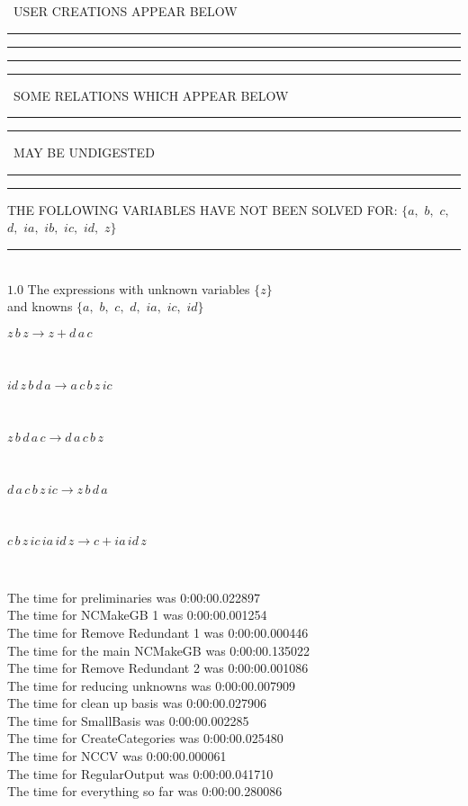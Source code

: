 \documentclass[rep10,leqno]{report}
\begin{document}
\ USER CREATIONS APPEAR BELOW\ 
\rule[2.5pt]{1.701in}{1pt}\hfil\break
\rule[2pt]{6in}{1pt}\hfil\break
\rule[2pt]{6in}{4pt}\hfil\break
\rule[2pt]{1.45in}{4pt}
\ SOME RELATIONS WHICH APPEAR BELOW\ 
\rule[2pt]{1.45in}{4pt}\hfil\break
\rule[2pt]{2.18in}{4pt}
\ MAY BE UNDIGESTED\ 
\rule[2pt]{2.18in}{4pt}\hfil\break
\rule[2pt]{6in}{4pt}\hfil\break
THE FOLLOWING VARIABLES HAVE NOT BEEN SOLVED FOR:\hfil\break
$\{a,
$ $
b,
$ $
c,
$ $
d,
$ $
ia,
$ $
ib,
$ $
ic,
$ $
id,
$ $
z\}$
\smallskip\\
\rule[3pt]{6in}{.7pt}\\
$1.0$  The expressions with unknown variables $\{z\}$\\
and knowns $\{a,
$ $
b,
$ $
c,
$ $
d,
$ $
ia,
$ $
ic,
$ $
id\}$\smallskip\\
\begin{minipage}{6in}
$
z\,
 b\,
 z\rightarrow z + d\,
 a\,
 c
$
\end{minipage}\medskip \\
\begin{minipage}{6in}
$
id\,
 z\,
 b\,
 d\,
 a\rightarrow a\,
 c\,
 b\,
 z\,
 ic
$
\end{minipage}\medskip \\
\begin{minipage}{6in}
$
z\,
 b\,
 d\,
 a\,
 c\rightarrow d\,
 a\,
 c\,
 b\,
 z
$
\end{minipage}\medskip \\
\begin{minipage}{6in}
$
d\,
 a\,
 c\,
 b\,
 z\,
 ic\rightarrow z\,
 b\,
 d\,
 a
$
\end{minipage}\medskip \\
\begin{minipage}{6in}
$
c\,
 b\,
 z\,
 ic\,
 ia\,
 id\,
 z\rightarrow c + ia\,
 id\,
 z
$
\end{minipage}\\
\vspace{10pt}

\noindent
The time for preliminaries was 0:00:00.022897\\
The time for NCMakeGB 1 was 0:00:00.001254\\
The time for Remove Redundant 1 was 0:00:00.000446\\
The time for the main NCMakeGB was 0:00:00.135022\\
The time for Remove Redundant 2 was 0:00:00.001086\\
The time for reducing unknowns was 0:00:00.007909\\
The time for clean up basis was 0:00:00.027906\\
The time for SmallBasis was 0:00:00.002285\\
The time for CreateCategories was 0:00:00.025480\\
The time for NCCV was 0:00:00.000061\\
The time for RegularOutput was 0:00:00.041710\\
The time for everything so far was 0:00:00.280086\\
\end{document}
